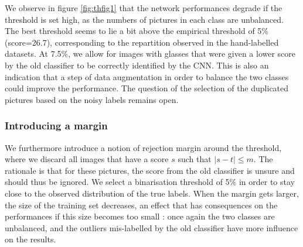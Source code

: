 \documentclass[a4paper]{article}
\begin{document}
            We observe in figure \ref{fig:thfig1} that the network performances degrade if the threshold is set high, as the numbers of pictures in each class are unbalanced. The best threshold seems to lie a bit above the empirical threshold of 5\% (score=26.7), corresponding to the repartition observed in the hand-labelled datasets. At 7.5\%, we allow for images with glasses that were given a lower score by the old classifier to be correctly identified by the CNN. This is also an indication that a step of data augmentation in order to balance the two classes could improve the performance. The question of the selection of the duplicated pictures based on the noisy labels remains open.

        \subsubsection{Introducing a margin}

            We furthermore introduce a notion of rejection margin around the threshold, where we discard all images that have a score $s$ such that $|s - t| \leq m$. The rationale is that for these pictures, the score from the old classifier is unsure and should thus be ignored. We select a binarisation threshold of 5\% in order to stay close to the observed distribution of the true labels. When the margin gets larger, the size of the training set decreases, an effect that has consequences on the performances if this size becomes too small : once again the two classes are unbalanced, and the outliers mis-labelled by the old classifier have more influence on the results.
\end{document}
